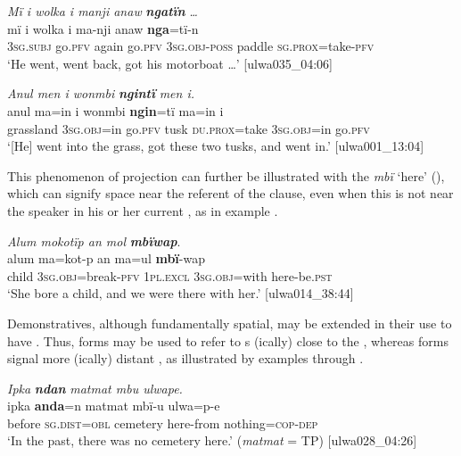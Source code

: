 \ea%
    \label{ex:det:99}
          \textit{Mï i wolka i manji anaw} \textbf{\textit{ngatïn}} \textit{…}\\
\gll    mï      i    wolka  i    ma-nji      anaw \textbf{nga}=tï-n\\
    3\textsc{sg.subj}  go.\textsc{pfv}  again  go.\textsc{pfv}  \textsc{3sg.obj-poss}  paddle    \textsc{sg.prox}=take-\textsc{pfv}\\
\glt `He went, went back, got his motorboat …’ [ulwa035\_04:06]
\z

\ea%
    \label{ex:det:100}
          \textit{Anul men i wonmbi} \textbf{\textit{ngintï}} \textit{men i.}\\
\gll    anul    ma=in      i    wonmbi  \textbf{ngin}=tï ma=in      i\\
    grassland  3\textsc{sg.obj}=in  go.\textsc{pfv}  tusk    \textsc{du.prox}=take     3\textsc{sg.obj}=in  go.\textsc{pfv}\\
\glt `[He] went into the grass, got these two tusks, and went in.’ [ulwa001\_13:04]
\z

This phenomenon of projection can further be illustrated with the  \textit{mbï} ‘here’ (), which can signify space near the referent of the clause, even when this is not near the speaker in his or her current , as in example .

\ea%
    \label{ex:det:101}
          \textit{Alum mokotïp an mol} \textbf{\textit{mbïwap}}.\\
\gll alum  ma=kot-p        an       ma=ul      \textbf{mbï}{}-wap\\
    child  3\textsc{sg.obj}=break-\textsc{pfv}  \textsc{1pl.excl}  3\textsc{sg.obj}=with  here-be.\textsc{pst}\\
\glt `She bore a child, and we were there with her.’ [ulwa014\_38:44]
\z

Demonstratives, although fundamentally spatial, may be extended in their use to have  . Thus,  forms may be used to refer to s (ically) close to the , whereas  forms signal more (ically) distant , as illustrated by examples  through .

\ea%
    \label{ex:det:102}
          \textit{Ipka} \textbf{\textit{ndan}} \textit{matmat mbu ulwape.}\\
\gll    ipka  \textbf{anda}=n    matmat  mbï-u    ulwa=p-e\\
    before  \textsc{sg.dist=obl}  cemetery  here-from  nothing=\textsc{cop-dep}\\
\glt `In the past, there was no cemetery here.’ (\textit{matmat} = TP) [ulwa028\_04:26]
\z

